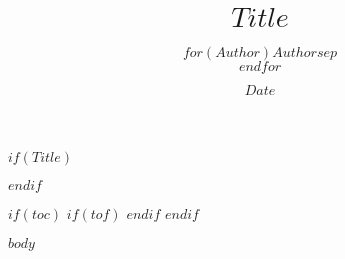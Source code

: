 \documentclass{web_article}
\title{$Title$}
\author{$for(Author)$$Author$$sep$\\$endfor$}
\date{$Date$}
\begin{document}
$if(Title)$
\maketitle
$endif$

$if(toc)$
\thispagestyle{empty}
\tableofcontents
$if(tof)$
$endif$
\newpage
\setcounter{page}{1}
$endif$

$body$
\end{document}

